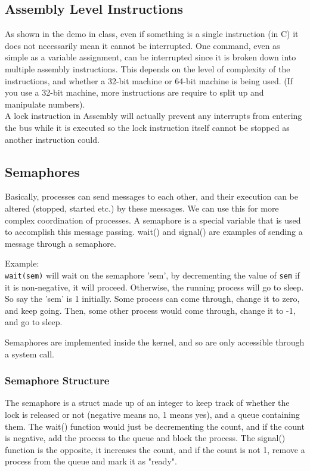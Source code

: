 \documentclass[12pt]{article}
\theoremstyle{definition}
\begin{document}
\subsection{Assembly Level Instructions}
As shown in the demo in class, even if something is a single instruction (in C) it does not necessarily mean it cannot be interrupted. One command, even as simple as a variable assignment, can be interrupted since it is broken down into multiple assembly instructions. This depends on the level of complexity of the instructions, and whether a 32-bit machine or 64-bit machine is being used. (If you use a 32-bit machine, more instructions are require  to split up and manipulate numbers).
\\ \linebreak
A lock instruction in Assembly will actually prevent any interrupts from entering the bus while it is executed so the lock instruction itself cannot be stopped as another instruction could.
\\ \linebreak

\subsection{Semaphores}
Basically, processes can send messages to each other, and their execution can be altered (stopped, started etc.) by these messages. We can use this for more complex coordination of processes. A semaphore is a special variable that is used to accomplish this message passing. wait() and signal() are examples of sending a message through a semaphore.
\\ \linebreak

Example:
\\
\texttt{wait(sem)} will wait on the semaphore 'sem', by decrementing the value of \texttt{sem} if it is non-negative, it will proceed. Otherwise, the running process will go to sleep. So say the 'sem' is 1 initially. Some process can come through, change it to zero, and keep going. Then, some other process would come through, change it to -1, and go to sleep.
\\ \linebreak

Semaphores are implemented inside the kernel, and so are only accessible through a system call.
\subsubsection{Semaphore Structure}
The semaphore is a struct made up of an integer to keep track of whether the lock is released or not (negative means no, 1 means yes), and a queue containing them. The wait() function would just be decrementing the count, and if the count is negative, add the process to the queue and block the process. The signal() function is the opposite, it increases the count, and if the count is not 1, remove a process from the queue and mark it as "ready".
\\ \linebreak
\end{document}
